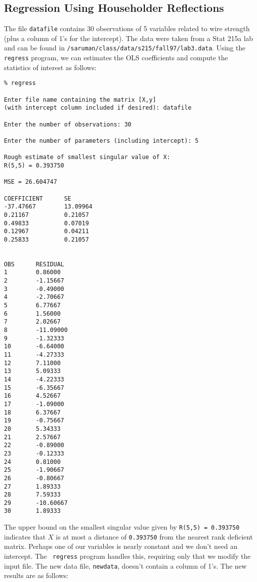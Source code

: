 \documentclass{article}
\begin{document}
\subsection{Regression Using Householder Reflections}
\label{sec:reg}
The file {\tt datafile} contains 30 observations of 5 variables
related to wire strength (plus a column of 1's for the intercept).  
The data were taken from a Stat 215a
lab and can be found in {\tt/saruman/class/data/s215/fall97/lab3.data}.  
Using the {\tt regress} program, we can estimates the OLS
coefficients and compute the statistics of interest as follows:

\begin{verbatim}
% regress
 
Enter file name containing the matrix [X,y] 
(with intercept column included if desired): datafile
 
Enter the number of observations: 30
 
Enter the number of parameters (including intercept): 5
 
Rough estimate of smallest singular value of X:
R(5,5) = 0.393750
 
MSE = 26.604747
 
COEFFICIENT      SE 
-37.47667        13.09964
0.21167          0.21057
0.49833          0.07019
0.12967          0.04211
0.25833          0.21057
 
 
OBS      RESIDUAL
1        0.86000
2        -1.15667
3        -0.49000
4        -2.70667
5        6.77667
6        1.56000
7        2.02667
8        -11.09000
9        -1.32333
10       -6.64000
11       -4.27333
12       7.11000
13       5.09333
14       -4.22333
15       -6.35667
16       4.52667
17       -1.09000
18       6.37667
19       -0.75667
20       5.34333
21       2.57667
22       -0.89000
23       -0.12333
24       0.81000
25       -1.90667
26       -0.80667
27       1.89333
28       7.59333
29       -10.60667
30       1.89333
\end{verbatim}
The upper bound on the smallest singular value given by
{\tt R(5,5) = 0.393750}
indicates that $X$ is at most a distance of {\tt 0.393750} 
from the nearest rank deficient matrix.  Perhaps one of our variables
is nearly constant and we don't need an intercept.  The {\tt
  regress} program handles this, requiring only that we modify the
input file.  The new data file, {\tt newdata}, doesn't contain a
column of 1's.  The new results are as follows:
\end{document}
